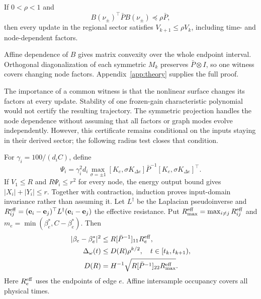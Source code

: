 \begin{btdlemma}
\label{lem:btd_endpoint}
If $0<\rho<1$ and
\begin{equation}
 B(\nu_\pm)^\top\bar P B(\nu_\pm)\preceq\rho\bar P,
 \label{eq:btd_d_endpoints}
\end{equation}
then every update in the regional sector satisfies
$V_{k+1}\le\rho V_k$, including time- and node-dependent factors.
\end{btdlemma}
Affine dependence of $B$ gives matrix convexity over the whole
endpoint interval. Orthogonal diagonalization of each symmetric
$M_k$ preserves $\bar P\otimes I$, so one witness covers changing
node factors. Appendix~\ref{app:theory} supplies the full proof.

The importance of a common witness is that the nonlinear surface
changes its factors at every update. Stability of one frozen-gain
characteristic polynomial would not certify the resulting trajectory.
The symmetric projection handles the node dependence without assuming
that all factors or graph modes evolve independently. However, this
certificate remains conditional on the inputs staying in their derived
sector; the following radius test closes that condition.

For $\gamma_i=100/(d_iC)$, define
\begin{equation}
 \Psi_i=\gamma_i^2d_i\max_{\sigma=\pm1}
 [K_e,\sigma K_{\Delta e}]\bar P^{-1}
 [K_e,\sigma K_{\Delta e}]^\top.
\end{equation}
If $V_1\le R$ and $R\Psi_i\le r^2$ for every node, the energy
output bound gives $|X_i|+|Y_i|\le r$. Together with contraction,
induction proves input-domain invariance rather than assuming it.
Let $L^\dagger$ be the Laplacian pseudoinverse and
$R_{ij}^{\rm eff}=(\mathbf e_i-\mathbf e_j)^\top L^\dagger
(\mathbf e_i-\mathbf e_j)$ the effective resistance. Put
$R_{\max}^{\rm eff}=\max_{i\ne j}R_{ij}^{\rm eff}$ and
$m_e=\min(\beta_e^*,C-\beta_e^*)$. Then
\begin{align}
 |\beta_e-\beta_e^*|^2&\le R[\bar P^{-1}]_{11}R_e^{\rm eff},\nonumber\\
 \Delta_\omega(t)&\le D(R)\rho^{k/2},\quad t\in[t_k,t_{k+1}),\nonumber\\
 D(R)&=H^{-1}\sqrt{R[\bar P^{-1}]_{22}R_{\max}^{\rm eff}}.
 \label{eq:btd_output_bounds_short}
\end{align}
Here $R_e^{\rm eff}$ uses the endpoints of edge $e$.
Affine intersample occupancy covers all physical times.


